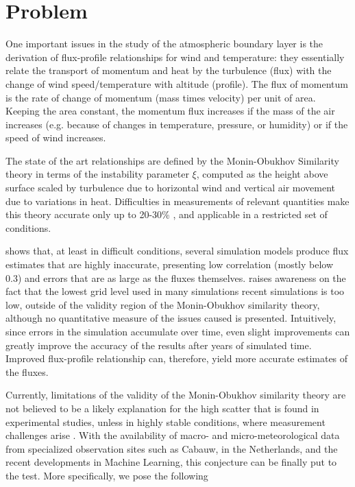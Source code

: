 \documentclass[a4paper]{book}
\begin{document}
\section{Problem}
\label{sec:problem}
One important issues in the study of the atmospheric boundary layer is the derivation of flux-profile relationships for wind and temperature: they essentially relate the transport of momentum and heat by the turbulence (flux) with the change of wind speed/temperature with altitude (profile). The flux of momentum is the rate of change of momentum (mass times velocity) per unit of area. Keeping the area constant, the momentum flux increases if the mass of the air increases (e.g. because of changes in temperature, pressure, or humidity) or if the speed of wind increases.

The state of the art relationships are defined by the Monin-Obukhov Similarity theory in terms of the instability parameter $\xi$, computed as the height above surface scaled by turbulence due to horizontal wind and vertical air movement due to variations in heat. Difficulties in measurements of relevant quantities make this theory accurate only up to 20-30\% \citep{basicatm}, and applicable in a restricted set of conditions.

\cite{sheba} shows that, at least in difficult conditions, several simulation models produce flux estimates that are highly inaccurate, presenting low correlation (mostly below 0.3) and errors that are as large as the fluxes themselves. \cite{most_les} raises awareness on the fact that the lowest grid level used in many simulations recent simulations is too low, outside of the validity region of the Monin-Obukhov similarity theory, although no quantitative measure of the issues caused is presented. Intuitively, since errors in the simulation accumulate over time, even slight improvements can greatly improve the accuracy of the results after years of simulated time. Improved flux-profile relationship can, therefore, yield more accurate estimates of the fluxes.

Currently, limitations of the validity of the Monin-Obukhov similarity theory are not believed to be a likely explanation for the high scatter that is found in experimental studies, unless in highly stable conditions, where measurement challenges arise \citep{basicatm}. With the availability of macro- and micro-meteorological data from specialized observation sites such as Cabauw, in the Netherlands, and the recent developments in Machine Learning, this conjecture can be finally put to the test. More specifically, we pose the following \\
\end{document}
